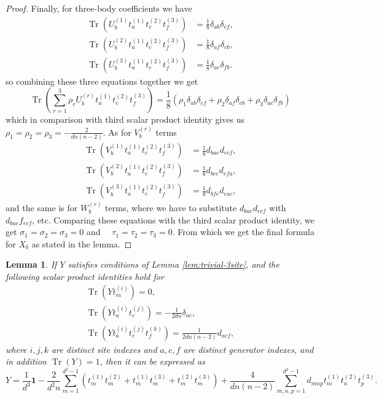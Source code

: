 \documentclass[10pt,twocolumn,superscriptaddress,aps,amsmath,amssymb,citeautoscript,floatfix,prx]{revtex4-2}
\theoremstyle{plain}
\theoremstyle{plain}
\theoremstyle{plain}
\theoremstyle{plain}
\theoremstyle{plain}
\theoremstyle{plain}
\theoremstyle{plain}
\newtheorem{smlemma}[smtheorem]{Lemma}
\theoremstyle{definition}
\theoremstyle{plain}
\begin{document}
\begin{appendix}
\begin{proof}
Finally, for three-body coefficients we have
\[
    \begin{aligned}
    \operatorname{Tr}\left(U_b^{(1)} t_a^{(1)} t_c^{(2)} t_f^{(3)}\right) & =\frac{1}{8} \delta_{a b} \delta_{c f}, \\
    \operatorname{Tr}\left(U_b^{(2)} t_a^{(1)} t_c^{(2)} t_f^{(3)}\right) & =\frac{1}{8} \delta_{a f} \delta_{c b}, \\
    \operatorname{Tr}\left(U_b^{(3)} t_a^{(1)} t_c^{(2)} t_f^{(3)}\right) & =\frac{1}{8} \delta_{a c} \delta_{f b} .
    \end{aligned}
\]
so combining these three equations together we get
\[
    \operatorname{Tr}\left(\sum_{r=1}^3 \rho_r U_b^{(r)} t_a^{(1)} t_c^{(2)} t_f^{(3)}\right)=\frac{1}{8}\left(\rho_1 \delta_{a b} \delta_{c f}+\rho_2 \delta_{a f} \delta_{c b}+\rho_3 \delta_{a c} \delta_{f b}\right)
\]
which in comparison with third scalar product identity gives us $\rho_1=\rho_2=\rho_3=-\frac{2}{d n(n-2)}$. 
As for $V_b^{(r)}$ terms
\[
    \begin{aligned}
    \operatorname{Tr}\left(V_b^{(1)} t_a^{(1)} t_c^{(2)} t_f^{(3)}\right) & =\frac{1}{8} d_{b a e} d_{e c f}, \\
    \operatorname{Tr}\left(V_b^{(2)} t_a^{(1)} t_c^{(2)} t_f^{(3)}\right) & =\frac{1}{8} d_{b c e} d_{e f a}, \\
    \operatorname{Tr}\left(V_b^{(3)} t_a^{(1)} t_c^{(2)} t_f^{(3)}\right) & =\frac{1}{8} d_{b f e} d_{e a c},
    \end{aligned}
\]
and the same is for $W_b^{(r)}$ terms, where we have to substitute $d_{b a e} d_{e c f}$ with $d_{b a e} f_{e c f}$, etc.
Comparing these equations with the third scalar product identity, we get $\sigma_1=\sigma_2=\sigma_3=0$ and $\quad \tau_1=\tau_2=\tau_3=0$.
From which we get the final formula for $X_b$ as stated in the lemma. 
\end{proof}

\begin{smlemma}\label{lem:covar_3-site_scalar_operator}
    If $Y$ satisfies conditions of Lemma \ref{lem:trivial-3site}, and the following scalar product identities hold for 
    \[
        \begin{gathered}
            \operatorname{Tr}\left(Y t_m^{(i)}\right)=0,\\
            \operatorname{Tr}\left(Y t_a^{(i)} t_c^{(j)}\right)=-\frac{1}{2 d n} \delta_{a c},\\
            \operatorname{Tr}\left(Y t_a^{(i)} t_c^{(j)} t_f^{(k)}\right)=\frac{1}{2 d n(n-2)} d_{a c f},
        \end{gathered}
    \]
    where $i, j, k$ are distinct site indexes and $a, c, f$ are distinct generator indexes, and in addition $\operatorname{Tr}(Y)=1$, then it can be expressed as
    \[
        Y=\frac{1}{d^3} \mathbf{1}-\frac{2}{d^2 n} \sum_{m=1}^{d^2-1}\left(t_m^{(1)} t_m^{(2)}+t_m^{(1)} t_m^{(3)}+t_m^{(2)} t_m^{(3)}\right)+\frac{4}{d n(n-2)} \sum_{m, n, p=1}^{d^2-1} d_{m n p} t_m^{(1)} t_n^{(2)} t_p^{(3)} .
    \]
\end{smlemma}


\end{appendix}
\end{document}
